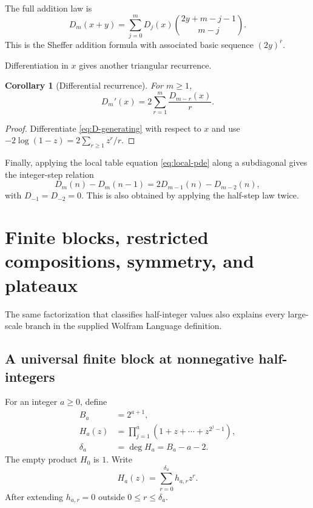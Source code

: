 \documentclass[11pt,oneside]{article}
\newtheorem{corollary}[theorem]{Corollary}
\theoremstyle{definition}
\theoremstyle{remark}
\newcommand{\Diag}{D}
\newcommand{\rising}[2]{#1^{\overline{#2}}}
\begin{document}
The full addition law is
\begin{equation}
 \Diag_m(x+y)=\sum_{j=0}^{m}\Diag_j(x)
  \binom{2y+m-j-1}{m-j}.
 \label{eq:addition-law}
\end{equation}
This is the Sheffer addition formula with associated basic sequence
$\rising{(2y)}r$.

Differentiation in $x$ gives another triangular recurrence.

\begin{corollary}[Differential recurrence]
\label{cor:differential}
For $m\ge1$,
\begin{equation}
 \Diag_m'(x)=2\sum_{r=1}^{m}\frac{\Diag_{m-r}(x)}{r}.
 \label{eq:differential}
\end{equation}
\end{corollary}

\begin{proof}
Differentiate \eqref{eq:D-generating} with respect to $x$ and use
$-2\log(1-z)=2\sum_{r\ge1}z^r/r$.
\end{proof}

Finally, applying the local table equation \eqref{eq:local-pde} along a
subdiagonal gives the integer-step relation
\begin{equation}
 \Diag_m(n)-\Diag_m(n-1)
 =2\Diag_{m-1}(n)-\Diag_{m-2}(n),
 \label{eq:diagonal-local}
\end{equation}
with $\Diag_{-1}=\Diag_{-2}=0$.  This is also obtained by applying the
half-step law twice.

\section{Finite blocks, restricted compositions, symmetry, and plateaux}
\label{sec:blocks}

The same factorization that classifies half-integer values also explains every
large-scale branch in the supplied Wolfram Language definition.

\subsection{A universal finite block at nonnegative half-integers}

For an integer $a\ge0$, define
\begin{align}
 B_a&=2^{a+1},
 \label{eq:Ba}\\
 H_a(z)&=\prod_{j=1}^{a}
   \left(1+z+\cdots+z^{2^j-1}\right),
 \label{eq:Ha}\\
 \delta_a&=\deg H_a=B_a-a-2.
 \label{eq:delta-a}
\end{align}
The empty product $H_0$ is $1$.  Write
\[
 H_a(z)=\sum_{r=0}^{\delta_a}h_{a,r}z^r.
\]
After extending $h_{a,r}=0$ outside $0\le r\le\delta_a$.
\end{document}

